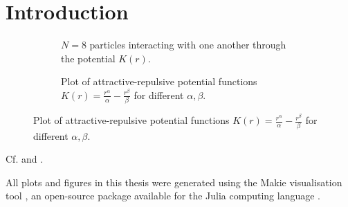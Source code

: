 \chapter{Introduction}
\label{chap:introduction}

\begin{figure}[H]
  \centering
  \begin{subfigure}[t]{0.5\textwidth}
    \centering
    \caption{$N = 8$ particles interacting with one another through the potential $K(r)$.}
    \label{fig:problem-setting}
  \end{subfigure}
  \hfill
  \begin{subfigure}[t]{0.49\textwidth}
    \centering
    \caption{Plot of attractive-repulsive potential functions $K(r) = \frac{r^\alpha}{\alpha} - \frac{r^\beta}{\beta}$ for different $\alpha, \beta$.}
    \label{fig:potential-function}
  \end{subfigure}
\end{figure}

Cf.  and .

All plots and figures in this thesis were generated using the Makie visualisation tool \parencite{2021-makie}, an open-source package available for the Julia computing language \parencite{2017-julia}.
